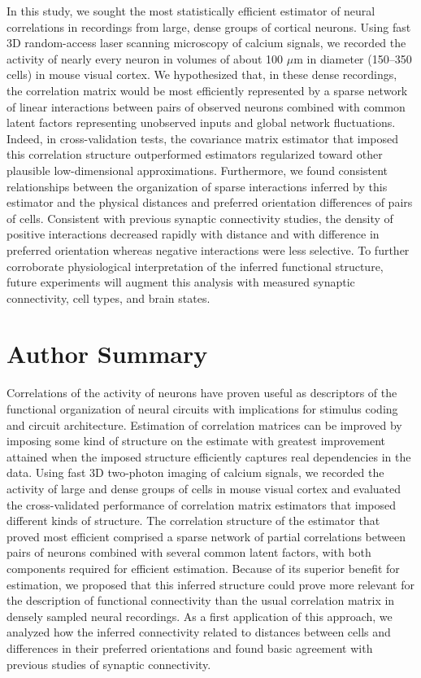 \documentclass[10pt]{article}
\begin{document}
In this study, we sought the most statistically efficient estimator of neural correlations in recordings from large, dense groups of cortical neurons.  Using fast 3D random-access laser scanning microscopy of calcium signals, we recorded the activity of nearly every neuron in volumes of about 100 $\mu$m in diameter (150--350 cells) in mouse visual cortex.  We hypothesized that, in these dense recordings, the correlation matrix would be most efficiently represented by a sparse network of linear interactions between pairs of observed neurons combined with common latent factors representing unobserved inputs and global network fluctuations.  Indeed, in cross-validation tests, the covariance matrix estimator that imposed this correlation structure outperformed estimators regularized toward other plausible low-dimensional approximations. Furthermore, we found consistent relationships between the organization of sparse interactions inferred by this estimator and the physical distances and preferred orientation differences of pairs of cells.  Consistent with previous synaptic connectivity studies, the density of positive interactions decreased rapidly with distance and with difference in preferred orientation whereas negative interactions were less selective.  To further corroborate physiological interpretation of the inferred functional structure, future experiments will augment this analysis with measured synaptic connectivity, cell types, and brain states.


\section*{Author Summary}
Correlations of the activity of neurons have proven useful as descriptors of the functional organization of neural circuits with implications for stimulus coding and circuit architecture.  Estimation of correlation matrices can be improved by imposing some kind of structure on the estimate with greatest improvement attained when the imposed structure efficiently captures real dependencies in the data. Using fast 3D two-photon imaging of calcium signals, we recorded the activity of large and dense groups of cells in mouse visual cortex and evaluated the cross-validated performance of correlation matrix estimators that imposed different kinds of structure. The correlation structure of the estimator that proved most efficient comprised a sparse network of partial correlations between pairs of neurons combined with several common latent factors, with both components required for efficient estimation. Because of its superior benefit for estimation, we proposed that this inferred structure could prove more relevant for the description of functional connectivity than the usual correlation matrix in densely sampled neural recordings. As a first application of this approach, we analyzed how the inferred connectivity related to distances between cells and differences in their preferred orientations and found basic agreement with previous studies of synaptic connectivity.
\end{document}
